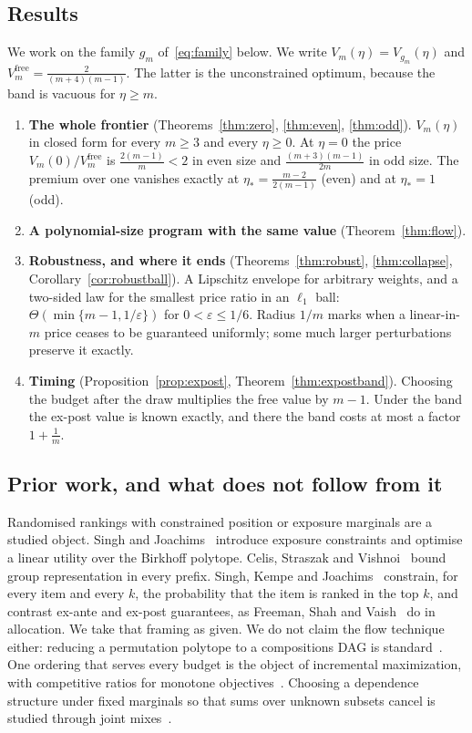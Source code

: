 \subsection{Results}

We work on the family $g_{m}$ of~\eqref{eq:family} below. We write
$V_{m}(\eta)=V_{g_{m}}(\eta)$ and $V^{\mathrm{free}}_{m}=\frac{2}{(m+4)(m-1)}$. The latter is
the unconstrained optimum, because the band is vacuous for $\eta\ge m$.

\begin{enumerate}
\item[1)] \textbf{The whole frontier} (Theorems~\ref{thm:zero}, \ref{thm:even},
\ref{thm:odd}). $V_{m}(\eta)$ in closed form for every $m\ge3$ and every $\eta\ge0$. At
$\eta=0$ the price $V_{m}(0)/V^{\mathrm{free}}_{m}$ is $\frac{2(m-1)}{m}<2$ in even size and
$\frac{(m+3)(m-1)}{2m}$ in odd size. The premium over one vanishes exactly at $\eta_{*}=\frac{m-2}{2(m-1)}$
(even) and at $\eta_{*}=1$ (odd).
\item[2)] \textbf{A polynomial-size program with the same value} (Theorem~\ref{thm:flow}).
\item[3)] \textbf{Robustness, and where it ends} (Theorems~\ref{thm:robust},
\ref{thm:collapse}, Corollary~\ref{cor:robustball}). A Lipschitz envelope for arbitrary
weights, and a two-sided law for the smallest price ratio in an $\ell_1$ ball:
$\Theta(\min\{m-1,1/\varepsilon\})$ for $0<\varepsilon\le1/6$.
Radius $1/m$ marks when a linear-in-$m$ price ceases to be guaranteed uniformly;
some much larger perturbations preserve it exactly.
\item[4)] \textbf{Timing} (Proposition~\ref{prop:expost}, Theorem~\ref{thm:expostband}).
Choosing the budget after the draw multiplies the free value by $m-1$. Under the band the
ex-post value is known exactly, and there the band costs at most a factor $1+\frac1m$.
\end{enumerate}

\subsection{Prior work, and what does not follow from it}

Randomised rankings with constrained position or exposure marginals are a studied object.
Singh and Joachims~\cite{singh2018} introduce exposure constraints and optimise a linear
utility over the Birkhoff polytope. Celis, Straszak and Vishnoi~\cite{celis2018} bound group
representation in every prefix. Singh, Kempe and Joachims~\cite{singh2021} constrain, for every
item and every $k$, the probability that the item is ranked in the top $k$, and contrast ex-ante
and ex-post guarantees, as Freeman, Shah and Vaish~\cite{freeman2020} do in allocation. We
take that framing as given. We do not claim the flow technique either: reducing a permutation
polytope to a compositions DAG is standard~\cite{schrijver2003}. One ordering that serves every
budget is the object of incremental maximization, with competitive ratios for monotone
objectives~\cite{disser2023,bienkowski2026}. Choosing a dependence structure under fixed
marginals so that sums over unknown subsets cancel is studied through joint
mixes~\cite{koike2022}.


